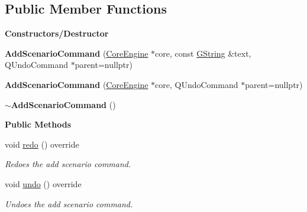 \subsection*{Public Member Functions}
\begin{Indent}\textbf{ Constructors/\+Destructor}\par
\begin{DoxyCompactItemize}
\item 
\mbox{\label{classrev_1_1_add_scenario_command_ad33645e62b7d4b3374663bb0d6a3a0ea}} 
{\bfseries Add\+Scenario\+Command} (\mbox{\hyperlink{classrev_1_1_core_engine}{Core\+Engine}} $\ast$core, const \mbox{\hyperlink{classrev_1_1_g_string}{G\+String}} \&text, Q\+Undo\+Command $\ast$parent=nullptr)
\item 
\mbox{\label{classrev_1_1_add_scenario_command_ac12c94cd08c62a09ab36537dfdc21e08}} 
{\bfseries Add\+Scenario\+Command} (\mbox{\hyperlink{classrev_1_1_core_engine}{Core\+Engine}} $\ast$core, Q\+Undo\+Command $\ast$parent=nullptr)
\item 
\mbox{\label{classrev_1_1_add_scenario_command_a5edccc24e2de82390747aa69d72e2572}} 
{\bfseries $\sim$\+Add\+Scenario\+Command} ()
\end{DoxyCompactItemize}
\end{Indent}
\begin{Indent}\textbf{ Public Methods}\par
\begin{DoxyCompactItemize}
\item 
\mbox{\label{classrev_1_1_add_scenario_command_a593016465eb5da9e176d566732c507ec}} 
void \mbox{\hyperlink{classrev_1_1_add_scenario_command_a593016465eb5da9e176d566732c507ec}{redo}} () override
\begin{DoxyCompactList}\small\item\em Redoes the add scenario command. \end{DoxyCompactList}\item 
\mbox{\label{classrev_1_1_add_scenario_command_a832c99c6b18189afbc17433a7207220c}} 
void \mbox{\hyperlink{classrev_1_1_add_scenario_command_a832c99c6b18189afbc17433a7207220c}{undo}} () override
\begin{DoxyCompactList}\small\item\em Undoes the add scenario command. \end{DoxyCompactList}\end{DoxyCompactItemize}
\end{Indent}
